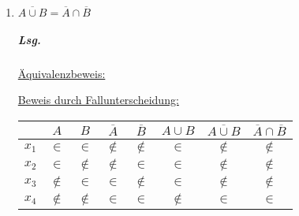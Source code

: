 \documentclass{scrreprt}
\begin{document}
\begin{enumerate}[(1)]
\item $\overline{A \cup B} = \overline{A} \cap \overline{B}$

  \subparagraph{Lsg.} \underline{Äquivalenzbeweis:}

  \newpage
  \underline{Beweis durch Fallunterscheidung:} \\
  \begin{center}
    \begin{tabular}{c | c | c | c | c | c | c | c}
      & $A$ & $B$ & $\overline{A}$ & $\overline{B}$ & $A \cup B$ & $\overline{A \cup B}$ & $\overline{A} \cap \overline{B}$ \\
      \hline
      $x_1$ & $\in$ & $\in$ & $\notin$ & $\notin$ & $\in$ & $\notin$ & $\notin$ \\
      $x_2$ & $\in$ & $\notin$ & $\notin$ & $\in$ & $\in$ & $\notin$ & $\notin$ \\
      $x_3$ & $\notin$ & $\in$ & $\in$  & $\notin$ & $\in$ & $\notin$ & $\notin$ \\
      $x_4$ & $\notin$ & $\notin$ & $\in$ & $\in$ & $\notin$ & $\in$ & $\in$
    \end{tabular}
  \end{center}
\end{enumerate}
\end{document}
